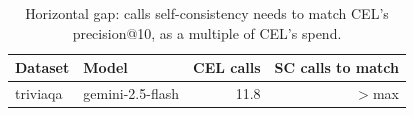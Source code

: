 \begin{table}[t]
\centering
\small
\begin{tabular}{llrr}
\toprule
Dataset & Model & CEL calls & SC calls to match \\
\midrule
triviaqa & gemini-2.5-flash & 11.8 & $>$max \\
\bottomrule
\end{tabular}
\caption{Horizontal gap: calls self-consistency needs to match CEL's precision@10, as a multiple of CEL's spend.}
\label{tab:hgap}
\end{table}

